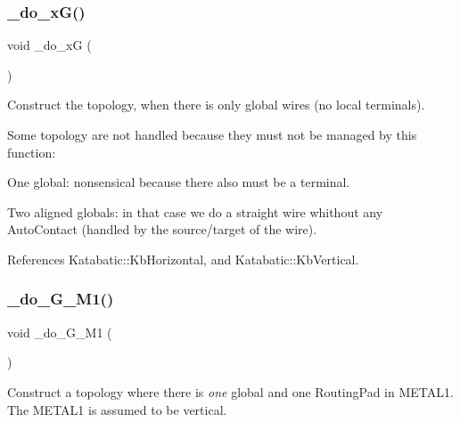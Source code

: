 \mbox{\label{group__LoadGlobalRouting_gaaa6d4ccd2eadfb6bc3e2cc98cfaf2cca}} 
\subsubsection{\texorpdfstring{\+\_\+do\+\_\+x\+G()}{\_do\_xG()}}
{\footnotesize\ttfamily void \+\_\+do\+\_\+xG (\begin{DoxyParamCaption}{ }\end{DoxyParamCaption})\hspace{0.3cm}{\ttfamily [private]}}

Construct the topology, when there is only global wires (no local terminals).

Some topology are not handled because they must not be managed by this function\+: 
\begin{DoxyItemize}
\item One global\+: nonsensical because there also must be a terminal. 
\item Two aligned globals\+: in that case we do a straight wire whithout any Auto\+Contact (handled by the source/target of the wire). 
\end{DoxyItemize}

 

References Katabatic\+::\+Kb\+Horizontal, and Katabatic\+::\+Kb\+Vertical.

\mbox{\label{group__LoadGlobalRouting_gad24a03e87e269f16dcc28d8c2d9f1cfb}} 
\subsubsection{\texorpdfstring{\+\_\+do\+\_\+G\+\_\+M1()}{\_do\_1G\_1M1()}}
{\footnotesize\ttfamily void \+\_\+do\+\_\+G\+\_\+M1 (\begin{DoxyParamCaption}{ }\end{DoxyParamCaption})\hspace{0.3cm}{\ttfamily [private]}}

Construct a topology where there is {\itshape one} global and one Routing\+Pad in {\ttfamily M\+E\+T\+A\+L1}. The {\ttfamily M\+E\+T\+A\+L1} is assumed to be vertical.


